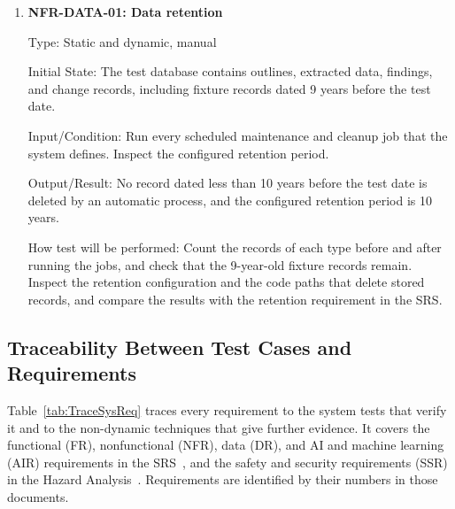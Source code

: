 \documentclass[12pt, titlepage]{article}
\begin{document}
\begin{enumerate}
Output/Result: The maintainer can deploy the system to the designated
McMaster University hosting environment and complete the core workflow
without undocumented steps. The documentation contains all required setup
information. The representative changes do not require unrelated components
to be rewritten, and the effort for each change is recorded relative to the
original implementation effort for the affected component.

How test will be performed: Give the documentation and clean hosting
environment to a new maintainer without providing undocumented guidance.
Observe the maintainer follow the installation and deployment instructions,
execute the core workflow, and record any missing or ambiguous steps. Review
the change diffs and effort records with the team, then document the results
against the Installability, Deployability, and Maintainability NFRs.

\item{\label{NFR-DATA-01}\textbf{NFR-DATA-01: Data retention}\\}

Type: Static and dynamic, manual

Initial State: The test database contains outlines, extracted data, findings,
and change records, including fixture records dated 9 years before the test
date.

Input/Condition: Run every scheduled maintenance and cleanup job that the
system defines. Inspect the configured retention period.

Output/Result: No record dated less than 10 years before the test date is
deleted by an automatic process, and the configured retention period is 10
years.

How test will be performed: Count the records of each type before and after
running the jobs, and check that the 9-year-old fixture records remain.
Inspect the retention configuration and the code paths that delete stored
records, and compare the results with the retention requirement in the SRS.

\end{enumerate}

\subsection{Traceability Between Test Cases and Requirements}\label{sec:TraceSysReq}

Table~\ref{tab:TraceSysReq} traces every requirement to the system tests that
verify it and to the non-dynamic techniques that give further evidence. It
covers the functional (FR), nonfunctional (NFR), data (DR), and AI and machine
learning (AIR) requirements in the SRS~\citep{TeamBVSH2026SRS}, and the safety
and security requirements (SSR) in the Hazard Analysis~\citep{TeamBVSH2026HA}.
Requirements are identified by their numbers in those documents.
\end{document}

